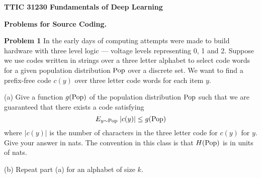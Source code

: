 \documentclass{article}
\newcommand{\solution}[1]{\bigskip {\color{red} {\bf Solution}: #1}}
\begin{document}
\centerline{\bf TTIC 31230 Fundamentals of Deep Learning}

\bigskip

\centerline{\bf Problems for Source Coding.}

\bigskip
\bigskip

{\bf Problem 1}
In the early days of computing attempts were made to build hardware with three level logic --- voltage levels representing
0, 1 and 2.  Suppose we use codes written in strings over a three letter alphabet to select code words for a given population
distribution $\mathrm{Pop}$ over a discrete set.  We want to find a prefix-free code $c(y)$ over three letter code words
for each item $y$.

\medskip
(a) Give a function $g(\mathrm{Pop})$ of the population distribution $\mathrm{Pop}$ such that we are guaranteed
that there exists a code satisfying
$$E_{y \sim \mathrm{Pop}}\;|c(y)| \leq g(\mathrm{Pop})$$
where $|c(y)|$ is the number of characters in the three letter code for $c(y)$ for $y$.
Give your answer in nats.  The convention in this class is that $H(\mathrm{Pop})$ is in units of nats.


\solution{
  $$E_{y \sim \pop}\;|y| \leq \frac{H(\pop)}{\ln 3} + 1$$
}

\medskip
(b) Repeat part (a) for an alphabet of size $k$.

\solution{
  $$E_{y \sim \pop}\;|y| \leq \frac{H(\pop)}{\ln k} + 1$$
}
\end{document}

